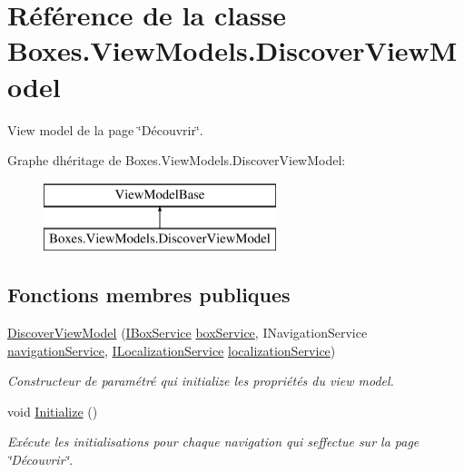 \hypertarget{class_boxes_1_1_view_models_1_1_discover_view_model}{}\section{Référence de la classe Boxes.\+View\+Models.\+Discover\+View\+Model}
\label{class_boxes_1_1_view_models_1_1_discover_view_model}


View model de la page \char`\"{}\+Découvrir\char`\"{}.  


Graphe d\textquotesingle{}héritage de Boxes.\+View\+Models.\+Discover\+View\+Model\+:\begin{figure}[H]
\begin{center}
\leavevmode
\includegraphics[height=2.000000cm]{class_boxes_1_1_view_models_1_1_discover_view_model}
\end{center}
\end{figure}
\subsection*{Fonctions membres publiques}
\begin{DoxyCompactItemize}
\item 
\hyperlink{class_boxes_1_1_view_models_1_1_discover_view_model_ae702aa7d97660570ac5febc56b780eb9}{Discover\+View\+Model} (\hyperlink{interface_boxes_1_1_services_1_1_box_1_1_i_box_service}{I\+Box\+Service} \hyperlink{class_boxes_1_1_view_models_1_1_discover_view_model_a2a376432019b9691d7186d7b836351c6}{box\+Service}, I\+Navigation\+Service \hyperlink{class_boxes_1_1_view_models_1_1_discover_view_model_ada996a561fb3c2c94eb9db6837fa2bcc}{navigation\+Service}, \hyperlink{interface_boxes_1_1_services_1_1_localization_1_1_i_localization_service}{I\+Localization\+Service} \hyperlink{class_boxes_1_1_view_models_1_1_discover_view_model_a0943f8df352f5b062555031016670a4d}{localization\+Service})
\begin{DoxyCompactList}\small\item\em Constructeur de paramétré qui initialize les propriétés du view model. \end{DoxyCompactList}\item 
void \hyperlink{class_boxes_1_1_view_models_1_1_discover_view_model_ade36b3877ca967fcb98389fbb5547d04}{Initialize} ()
\begin{DoxyCompactList}\small\item\em Exécute les initialisations pour chaque navigation qui s\textquotesingle{}effectue sur la page \char`\"{}\+Découvrir\char`\"{}. \end{DoxyCompactList}\end{DoxyCompactItemize}
